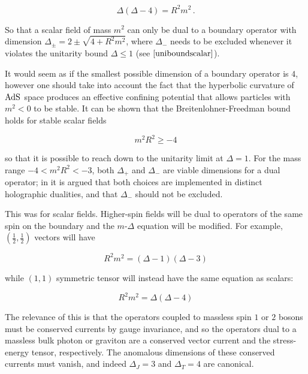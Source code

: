 \begin{equation}
	\Delta (\Delta-4) = R^2 m^2\,.
	\label{}
\end{equation}

So that a scalar field of mass $m^2$ can only be dual to a boundary operator with dimension $\Delta_{\pm} = 2 \pm \sqrt{4 + R^2 m^2}$, where $\Delta_-$ needs to be excluded whenever it violates the unitarity bound $\Delta \leq 1$ (see $\eqref{uniboundscalar}$).

It would seem as if the smallest possible dimension of a boundary operator is $4$, however one should take into account the fact that the hyperbolic curvature of $\operatorname{AdS}_{}$ space produces an effective confining potential that allows particles with $m^2 < 0$ to be stable. It can be shown\cite{BFbound} that the Breitenlohner-Freedman bound holds for stable scalar fields

\begin{equation}
	m^2 R^2 \geq - 4
	\label{}
\end{equation}

so that it is possible to reach down to the unitarity limit at $\Delta = 1$. For the mass range $-4 < m^2 R^2 < -3$, both $\Delta_+$ and $\Delta_-$ are viable dimensions for a dual operator; in \cite{KW_SB} it is argued that both choices are implemented in distinct holographic dualities, and that $\Delta_-$ should not be excluded.


This was for scalar fields. Higher-spin fields will be dual to operators of the same spin on the boundary and the $m$-$\Delta$ equation will be modified\cite{lezionilosanna}. For example, $(\frac{1}{2},\frac{1}{2})$ vectors will have

\begin{equation}
	R^2 m^2 = (\Delta-1)(\Delta-3)
	\label{}
\end{equation}

while $(1,1)$ symmetric tensor will instead have the same equation as scalars:

\begin{equation}
	R^2 m^2 = \Delta (\Delta-4)
	\label{}
\end{equation}

The relevance of this is that the operators coupled to massless spin $1$ or $2$ bosons must be conserved currents by gauge invariance, and so the operators dual to a massless bulk photon or graviton are a conserved vector current and the stress-energy tensor, respectively. The anomalous dimensions of these conserved currents must vanish, and indeed $\Delta_J = 3$ and $\Delta_T = 4$ are canonical.

